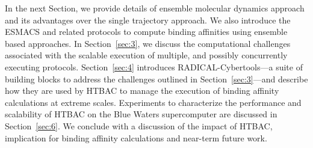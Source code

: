 In the next Section, we provide details of ensemble molecular dynamics
approach and its advantages over the single trajectory approach. We also
introduce the ESMACS and related protocols to compute binding affinities
using ensemble based approaches. In Section~\ref{sec:3}, we discuss the
computational challenges associated with the scalable execution of multiple,
and possibly concurrently executing protocols. Section~\ref{sec:4} introduces
RADICAL-Cybertools---a suite of building blocks to address the challenges
outlined in Section~\ref{sec:3}---and describe how they are used by HTBAC to
manage the execution of binding affinity calculations at extreme scales.
Experiments to characterize the performance and scalability of HTBAC
 on the Blue Waters supercomputer are discussed in
Section~\ref{sec:6}. We conclude with a discussion of the impact of HTBAC,
implication for binding affinity calculations and near-term future work.